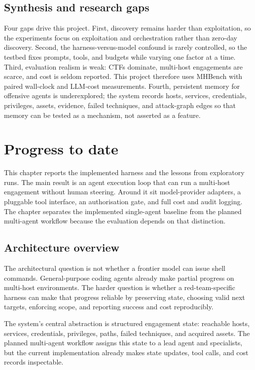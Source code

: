 \documentclass[12pt,oneside]{report}
\begin{document}
\section{Synthesis and research gaps}
Four gaps drive this project. First, discovery remains harder than exploitation,
so the experiments focus on exploitation and orchestration rather than zero-day
discovery. Second, the harness-versus-model confound is rarely controlled, so the
testbed fixes prompts, tools, and budgets while varying one factor at a time.
Third, evaluation realism is weak: CTFs dominate, multi-host engagements are
scarce, and cost is seldom reported. This project therefore uses MHBench with
paired wall-clock and LLM-cost measurements. Fourth, persistent memory for
offensive agents is underexplored; the system records hosts, services,
credentials, privileges, assets, evidence, failed techniques, and attack-graph
edges so that memory can be tested as a mechanism, not asserted as a feature.

\chapter{Progress to date}
\label{ch:progress}

This chapter reports the implemented harness and the lessons from exploratory
runs. The main result is an agent execution loop that can run a multi-host
engagement without human steering. Around it sit model-provider adapters, a
pluggable tool interface, an authorisation gate, and full cost and audit logging.
The chapter separates the implemented single-agent baseline from the planned
multi-agent workflow because the evaluation depends on that distinction.

\section{Architecture overview}
The architectural question is not whether a frontier model can issue shell
commands. General-purpose coding agents already make partial progress on
multi-host environments. The harder question is whether a red-team-specific
harness can make that progress reliable by preserving state, choosing valid next
targets, enforcing scope, and reporting success and cost reproducibly.

The system's central abstraction is structured engagement state: reachable
hosts, services, credentials, privileges, paths, failed techniques, and acquired
assets. The planned multi-agent workflow assigns this state to a lead agent and
specialists, but the current implementation already makes state updates, tool
calls, and cost records inspectable.
\end{document}
